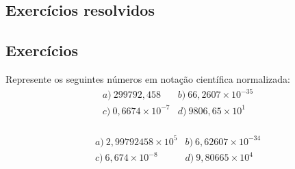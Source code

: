 \subsection*{Exercícios resolvidos}

\construirExeresol

\subsection*{Exercícios}

\construirExer

\begin{exer}\label{exer:notacao_cientifica_normalizada}
  Represente os seguintes números em notação científica normalizada:
  \begin{equation}
    \begin{array}{ll}
      a)~299792,458 & b)~66,2607\times 10^{-35}\\
      c)~0,6674\times 10^{-7} & d)~9806,65\times 10^{1}
    \end{array}
  \end{equation}
  \begin{eqnarray}
  \end{eqnarray}
\end{exer}
\begin{resp}
  \begin{equation}
  \begin{array}{ll}
    a)~2,99792458\times 10^5 & b)~6,62607\times 10^{-34}\\
    c)~6,674\times 10^{-8} & d)~9,80665\times 10^4
  \end{array}
  \end{equation}
\end{resp}

